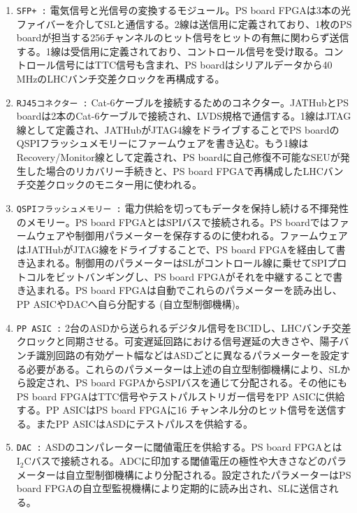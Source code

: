 \baselineskip

\begin{enumerate}
    \item \texttt{SFP+ :} 電気信号と光信号の変換するモジュール。PS board FPGAは3本の光ファイバーを介してSLと通信する。2線は送信用に定義されており、1枚のPS boardが担当する256チャンネルのヒット信号をヒットの有無に関わらず送信する。1線は受信用に定義されており、コントロール信号を受け取る。コントロール信号にはTTC信号も含まれ、PS boardはシリアルデータから40 MHzのLHCバンチ交差クロックを再構成する。
    \baselineskip

    \item \texttt{RJ45コネクター :} Cat-6ケーブルを接続するためのコネクター。JATHubとPS boardは2本のCat-6ケーブルで接続され、LVDS規格で通信する。1線はJTAG線として定義され、JATHubがJTAG4線をドライブすることでPS boardのQSPIフラッシュメモリーにファームウェアを書き込む。もう1線はRecovery/Monitor線として定義され、PS boardに自己修復不可能なSEUが発生した場合のリカバリー手続きと、PS board FPGAで再構成したLHCバンチ交差クロックのモニター用に使われる。
    \baselineskip

    \item \texttt{QSPIフラッシュメモリー :} 電力供給を切ってもデータを保持し続ける不揮発性のメモリー。PS board FPGAとはSPIバスで接続される。PS boardではファームウェアや制御用パラメーターを保存するのに使われる。ファームウェアはJATHubがJTAG線をドライブすることで、PS board FPGAを経由して書き込まれる。制御用のパラメーターはSLがコントロール線に乗せてSPIプロトコルをビットバンギングし、PS board FPGAがそれを中継することで書き込まれる。PS board FPGAは自動でこれらのパラメーターを読み出し、PP ASICやDACへ自ら分配する (自立型制御機構)。
    \baselineskip

    \item \texttt{PP ASIC :} 2台のASDから送られるデジタル信号をBCIDし、LHCバンチ交差クロックと同期させる。可変遅延回路における信号遅延の大きさや、陽子バンチ識別回路の有効ゲート幅などはASDごとに異なるパラメーターを設定する必要がある。これらのパラメーターは上述の自立型制御機構により、SLから設定され、PS board FGPAからSPIバスを通じて分配される。その他にもPS board FPGAはTTC信号やテストパルストリガー信号をPP ASICに供給する。PP ASICはPS board FPGAに16 チャンネル分のヒット信号を送信する。またPP ASICはASDにテストパルスを供給する。
    \baselineskip            

    \item \texttt{DAC :} ASDのコンパレーターに閾値電圧を供給する。PS board FPGAとは$\mathrm{I_{2}C}$バスで接続される。ADCに印加する閾値電圧の極性や大きさなどのパラメーターは自立型制御機構により分配される。設定されたパラメーターはPS board FPGAの自立型監視機構により定期的に読み出され、SLに送信される。
    \baselineskip


\end{enumerate}
